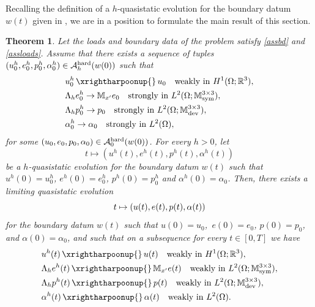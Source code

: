 \documentclass[reqno,10pt]{amsart}
\numberwithin{equation}{section}
\newtheorem{theorem}{Theorem}[section]
\theoremstyle{remark}
\newcommand{\BLACK}{\color{black}}
\newcommand{\PINK}{\color{black}}
\newcommand{\calA}{\mathcal{A}}
\newcommand{\M}{\mathbb{M}}
\newcommand{\R}{\mathbb{R}}
\DeclareMathOperator{\dev}{dev}
\DeclareMathOperator{\sym}{sym}
\newcommand{\strong}{\to}
\newcommand{\weak}{\,\xrightharpoonup{}\,}
\begin{document}
Recalling the definition of a $h$-quasistatic evolution for the boundary datum $w(t)$ given in , we are in a position to formulate the main result of this section.

\begin{theorem} \label{main result 1}
{\PINK Let the loads and boundary data of the problem satisfy \eqref{assbd} and \eqref{assloads}.\BLACK}
Assume that there exists a sequence of tuples $(u^h_0, e^h_0, p^h_0, \alpha^h_0) \in \calA_{h}^{\rm hard}(w(0))$ such that
\begin{align}
	& u^h_0 \weak u_0 \quad \text{weakly in $H^1(\Omega;\R^3)$}, \label{main result u^h_0 condition}\\
	& \Lambda_h e^h_0 \strong \M_{x'}e_0 \quad \text{strongly in $L^2(\Omega;\M^{3 \times 3}_{\sym})$}, \label{main result e^h_0 condition}\\
	& \Lambda_h p^h_0 \strong p_0 \quad \text{strongly in $L^2(\Omega;\M^{3 \times 3}_{\dev})$}, \label{main result p^h_0 condition}\\
	& \alpha^h_0 \strong \alpha_0 \quad \text{strongly in $L^2(\Omega)$}, \label{main result alpha^h_0 condition}
\end{align}
for some $(u_0, e_0, p_0, \alpha_0) \in \calA_{0}^{\rm hard}(w(0))$. 
For every $h > 0$, let 
\begin{equation*}
	t \mapsto (u^h(t), e^h(t), p^h(t), \alpha^h(t))
\end{equation*}
be a $h$-quasistatic evolution for the boundary datum $w(t)$ such that $u^h(0) = u^h_0$, $e^h(0) = e^h_0$, $p^h(0) = p^h_0$ and $\alpha^h(0) = \alpha_0$. 
Then, there exists a limiting quasistatic evolution
\vspace{-0.25\baselineskip}
\begin{equation*}
	t \mapsto (u(t), e(t), p(t), \alpha(t)) \vspace{-0.25\baselineskip}
\end{equation*}
for the boundary datum $w(t)$ such that $u(0) = u_0$,\, $e(0) = e_0$, $p(0) = p_0$, and $\alpha(0) = \alpha_0$, and such that on a subsequence
for every $t \in [0, T]$ we have 
\begin{align}
	& u^h(t) \weak u(t) \quad \text{weakly in $H^1(\Omega;\R^3)$}, \label{main result u^h(t)}\\
	& \Lambda_h e^h(t) \weak \M_{x'} e(t) \quad \text{weakly in $L^2(\Omega;\M^{3 \times 3}_{\sym})$}, \label{main result e^h(t)}\\
	& \Lambda_h p^h(t) \weak p(t) \quad \text{weakly in $L^2(\Omega;\M^{3 \times 3}_{\dev})$}, \label{main result p^h(t)}\\
	& \alpha^h(t) \weak \alpha(t) \quad \text{weakly in $L^2(\Omega)$}. \label{main result alpha^h(t)}
\end{align}
\end{theorem}
\end{document}
